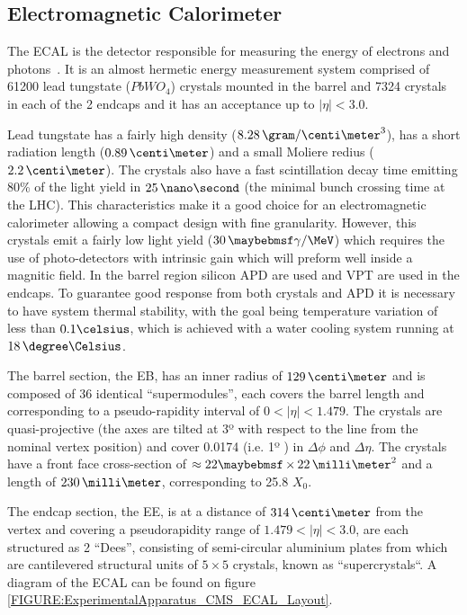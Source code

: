 \subsection{Electromagnetic Calorimeter}
\label{SUBSECTION:ExperimentalApparatus_CMS_ECAL}


The \gls{ECAL} is the detector responsible for measuring the energy of electrons and photons~\cite{CMSTDR:CMSECAL,CMSTDR:CMSECALAddendum}. It is an almost hermetic energy measurement system comprised of 61200 lead tungstate ($PbWO_4$) crystals mounted in the barrel and 7324 crystals in each of the 2 endcaps and it has an acceptance up to $|\eta|<3.0$.

Lead tungstate has a fairly high density ($8.28\,\gram/\centi\meter^3$), has a short radiation length ($0.89\,\centi\meter$) and a small Moliere redius ($2.2\,\centi\meter$). The crystals also have a fast scintillation decay time emitting 80\% of the light yield in $25\,\nano\second$ (the minimal bunch crossing time at the \gls{LHC}). This characteristics make it a good choice for an electromagnetic calorimeter allowing a compact design with fine granularity. However, this crystals emit a fairly low light yield ($30\,\gamma/\MeV$) which requires the use of photo-detectors with intrinsic gain which will preform well inside a magnitic field. In the barrel region silicon \gls{APD} are used and \gls{VPT} are used in the endcaps. To guarantee good response from both crystals and \gls{APD} it is necessary to have system thermal stability, with the goal being temperature variation of less than $0.1 \celsius$, which is achieved with a water cooling system running at $18\,\degree\Celsius$.

The barrel section, the \gls{EB}, has an inner radius of $129\,\centi\meter$ and is composed of 36 identical ``supermodules'', each covers the barrel length and corresponding to a pseudo-rapidity interval of $0<|\eta|<1.479$. The crystals are quasi-projective (the axes are tilted at 3º with respect to the line from the nominal vertex position) and cover 0.0174 (i.e. 1º ) in $\Delta\phi$ and $\Delta\eta$. The crystals have a front face cross-section of $\approx 22 \times 22\,\milli\meter^2$ and a length of $230\,\milli\meter$, corresponding to 25.8 $X_0$.

The endcap section, the \gls{EE}, is at a distance of $314\,\centi\meter$ from the vertex and covering a pseudorapidity range of $1.479<|\eta|<3.0$, are each structured as 2 ``Dees'', consisting of semi-circular aluminium plates from which are cantilevered structural units of $5\times 5$ crystals, known as ``supercrystals``. A diagram of the \gls{ECAL} can be found on figure \ref{FIGURE:ExperimentalApparatus_CMS_ECAL_Layout}.

